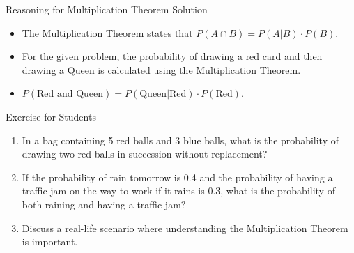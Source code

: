 \begin{frame}{Reasoning for Multiplication Theorem Solution}
  \begin{itemize}
    \item The Multiplication Theorem states that \(P(A \cap B) = P(A|B) \cdot P(B)\).
    \item For the given problem, the probability of drawing a red card and then drawing a Queen is calculated using the Multiplication Theorem.
    \item \(P(\text{Red and Queen}) = P(\text{Queen}|\text{Red}) \cdot P(\text{Red})\).
  \end{itemize}
\end{frame}

\begin{frame}{Exercise for Students}
  \begin{enumerate}
    \item In a bag containing 5 red balls and 3 blue balls, what is the probability of drawing two red balls in succession without replacement?
    \item If the probability of rain tomorrow is 0.4 and the probability of having a traffic jam on the way to work if it rains is 0.3, what is the probability of both raining and having a traffic jam?
    \item Discuss a real-life scenario where understanding the Multiplication Theorem is important.
  \end{enumerate}
\end{frame}
